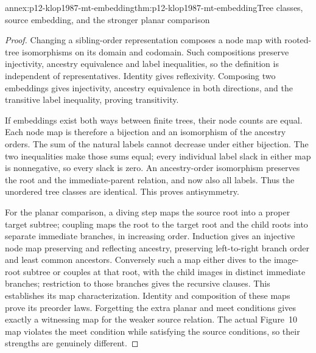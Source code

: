 \begin{annexitem}{annex:p12-klop1987-mt-embedding}{thm:p12-klop1987-mt-embedding}{Tree classes, source embedding, and the stronger planar comparison}
\begin{proof}
Changing a sibling-order representation composes a node map with
rooted-tree isomorphisms on its domain and codomain. Such compositions
preserve injectivity, ancestry equivalence and label inequalities, so
the definition is independent of representatives. Identity gives
reflexivity. Composing two embeddings gives injectivity, ancestry
equivalence in both directions, and the transitive label inequality,
proving transitivity.

If embeddings exist both ways between finite trees, their node counts
are equal. Each node map is therefore a bijection and an isomorphism
of the ancestry orders. The sum of the natural labels cannot decrease
under either bijection. The two inequalities make those sums equal;
every individual label slack in either map is nonnegative, so every
slack is zero. An ancestry-order isomorphism preserves the root and
the immediate-parent relation, and now also all labels. Thus the
unordered tree classes are identical. This proves antisymmetry.

For the planar comparison, a diving step maps the source root into
a proper target subtree; coupling maps the root to the target root
and the child roots into separate immediate branches, in increasing
order. Induction gives an injective node map preserving and reflecting
ancestry, preserving left-to-right branch order and least common
ancestors. Conversely such a map either dives to the image-root
subtree or couples at that root, with the child images in distinct
immediate branches; restriction to those branches gives the recursive
clauses. This establishes its map characterization. Identity and
composition of these maps prove its preorder laws. Forgetting the
extra planar and meet conditions gives exactly a witnessing map for
the weaker source relation. The actual Figure~10 map violates the
meet condition while satisfying the source conditions, so their
strengths are genuinely different.
\end{proof}
\end{annexitem}

